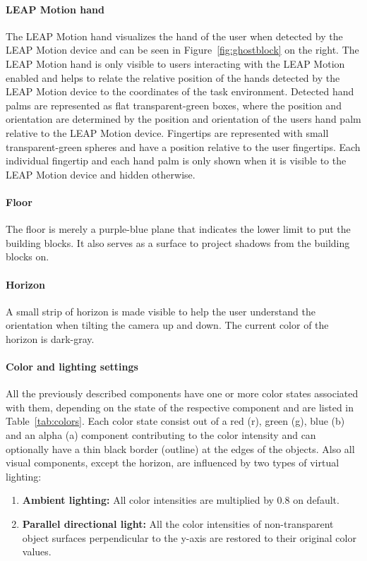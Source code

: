 \paragraph{LEAP Motion hand}
The LEAP Motion hand visualizes the hand of the user when detected by the LEAP Motion device and can be seen in Figure~\ref{fig:ghostblock} on the right. The LEAP Motion hand is only visible to users interacting with the LEAP Motion enabled and helps to relate the relative position of the hands detected by the LEAP Motion device to the coordinates of the task environment. Detected hand palms are represented as flat transparent-green boxes, where the position and orientation are determined by the position and orientation of the users hand palm relative to the LEAP Motion device. Fingertips are represented with small transparent-green spheres and have a position relative to the user fingertips. Each individual fingertip and each hand palm is only shown when it is visible to the LEAP Motion device and hidden otherwise.

\paragraph{Floor}
The floor is merely a purple-blue plane that indicates the lower limit to put the building blocks. It also serves as a surface to project shadows from the building blocks on.

\paragraph{Horizon}
A small strip of horizon is made visible to help the user understand the orientation when tilting the camera up and down. The current color of the horizon is dark-gray.


\paragraph{Color and lighting settings}

All the previously described components have one or more color states associated with them, depending on the state of the respective component and are listed in Table~\ref{tab:colors}. Each  color state consist out of a red (r), green (g), blue (b) and an alpha (a) component contributing to the color intensity and can optionally have a thin black border (outline) at the edges of the objects. Also all visual components, except the horizon, are influenced by two types of virtual lighting: 
\begin{enumerate}
	\item{\textbf{Ambient lighting:}} All color intensities are multiplied by $0.8$ on default.
	\item{\textbf{Parallel directional light:}} All the color intensities of non-transparent object surfaces perpendicular to the y-axis are restored to their original color values.
\end{enumerate}



